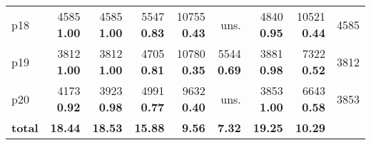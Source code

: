 \begin{tabular}{|l|rrrrrrr|r|}
p18 & {\footnotesize 4585} \textbf{1.00} & {\footnotesize 4585} \textbf{1.00} & {\footnotesize 5547} \textbf{0.83} & {\footnotesize 10755} \textbf{0.43} & uns. & {\footnotesize 4840} \textbf{0.95} & {\footnotesize 10521} \textbf{0.44} & 4585\\
p19 & {\footnotesize 3812} \textbf{1.00} & {\footnotesize 3812} \textbf{1.00} & {\footnotesize 4705} \textbf{0.81} & {\footnotesize 10780} \textbf{0.35} & {\footnotesize 5544} \textbf{0.69} & {\footnotesize 3881} \textbf{0.98} & {\footnotesize 7322} \textbf{0.52} & 3812\\
p20 & {\footnotesize 4173} \textbf{0.92} & {\footnotesize 3923} \textbf{0.98} & {\footnotesize 4991} \textbf{0.77} & {\footnotesize 9632} \textbf{0.40} & uns. & {\footnotesize 3853} \textbf{1.00} & {\footnotesize 6643} \textbf{0.58} & 3853\\
\hline
\textbf{total} & \textbf{18.44} & \textbf{18.53} & \textbf{15.88} & \textbf{9.56} & \textbf{7.32} & \textbf{19.25} & \textbf{10.29} & \\
\hline
\end{tabular}

